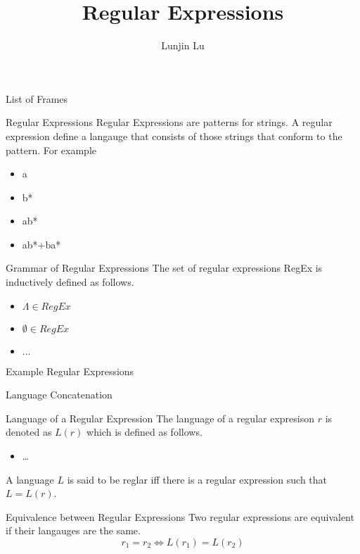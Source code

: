 \documentclass{beamer}
\title{Regular Expressions}
\author{Lunjin Lu}
\date{}
\makeatletter
\newif\ifframeinlbf
\newcommand\listofframes{\@starttoc{lbf}}
\makeatother
\begin{document}
\begin{comment}
\end{comment}
\frameinlbffalse
\begin{frame}{List of Frames}
    \listofframes
\end{frame}
\frameinlbftrue


\frame{ \titlepage
}

\begin{frame}{Regular Expressions}
Regular Expressions are patterns for strings. A regular expression define a langauge that 
consists of those strings that conform to the pattern. For example
\begin{itemize}
  \item a 
  \item b*
  \item ab*
  \item ab*+ba*
\end{itemize}
\end{frame}

\begin{frame}{Grammar of Regular Expressions }
The set of regular expressions RegEx is inductively defined as follows. 
\begin{itemize}
  \item $\Lambda\in RegEx$
  \item $\emptyset\in RegEx$
  \item $\ldots$
\end{itemize}
\end{frame}

\begin{frame}{Example Regular Expressions}

\end{frame}

\begin{frame}{Language Concatenation}

\end{frame}

\begin{frame}{Language of a Regular Expression} 
The language of a regular expresison $r$ is denoted as $L(r)$ which is defined as follows. 
\begin{itemize}
  \item \ldots
\end{itemize}

A language $L$ is said to be reglar iff there is a regular expression such that $L=L(r)$.
\end{frame}

\begin{frame}{Equivalence between Regular Expressions}
Two regular expressions are equivalent if their langauges are the same. 
\[ r_1=r_2 \Longleftrightarrow L(r_1)=L(r_2)
\]
\end{frame}
\end{document}
